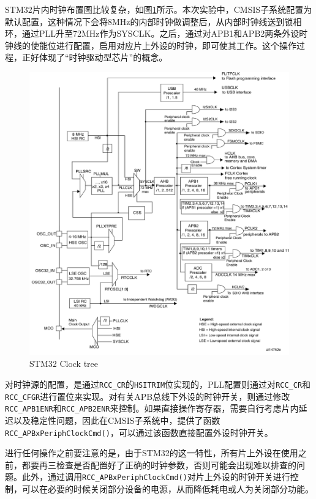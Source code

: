\documentclass{ctexart}
\begin{document}
STM32片内时钟布置图比较复杂，如图\ref{stm32clocktree}所示。本次实验中，CMSIS子系统配置为默认配置，这种情况下会将8MHz的内部时钟做调整后，从内部时钟线送到锁相环，通过PLL升至72MHz作为SYSCLK。之后，通过对APB1和APB2两条外设时钟线的使能位进行配置，启用对应片上外设的时钟，即可使其工作。这个操作过程，正好体现了“时钟驱动型芯片”的概念。
\begin{figure}[!p]\centering\includegraphics[width=\textwidth]{./img/clocktree.png}\caption{STM32 Clock tree}\label{stm32clocktree}\end{figure}

对时钟源的配置，是通过\lstinline{RCC_CR}的\lstinline{HSITRIM}位实现的，PLL配置则通过对\lstinline{RCC_CR}和\lstinline{RCC_CFGR}进行置位来实现。对有关APB总线下外设的时钟开关，则通过修改\lstinline{RCC_APB1ENR}和\lstinline{RCC_APB2ENR}来控制。如果直接操作寄存器，需要自行考虑片内延迟以及稳定性问题，因此在CMSIS子系统中，提供了函数\lstinline{RCC_APBxPeriphClockCmd()}，可以通过该函数直接配置外设时钟开关。

进行任何操作之前要注意的是，由于STM32的这一特性，所有片上外设在使用之前，都要再三检查是否配置好了正确的时钟参数，否则可能会出现难以排查的问题。此外，通过调用\lstinline{RCC_APBxPeriphClockCmd()}对片上外设的时钟开关进行控制，可以在必要的时候关闭部分设备的电源，从而降低耗电或人为关闭部分功能。
\end{document}
